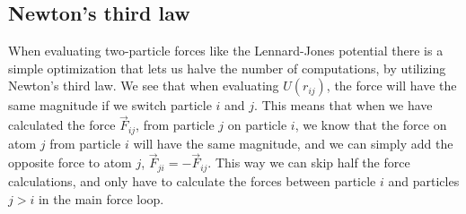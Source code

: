 \subsection{Newton's third law}
When evaluating two-particle forces like the Lennard-Jones potential there is a simple optimization that lets us halve the number of computations, by utilizing Newton's third law. We see that when evaluating $U(r_{ij})$, the force will have the same magnitude if we switch particle $i$ and $j$. This means that when we have calculated the force $\vec F_{ij}$, from particle $j$ on particle $i$, we know that the force on atom $j$ from particle $i$ will have the same magnitude, and we can simply add the opposite force to atom $j$, $\vec F_{ji} = -\vec F_{ij}$. This way we can skip half the force calculations, and only have to calculate the forces between particle $i$ and particles $j>i$ in the main force loop.

